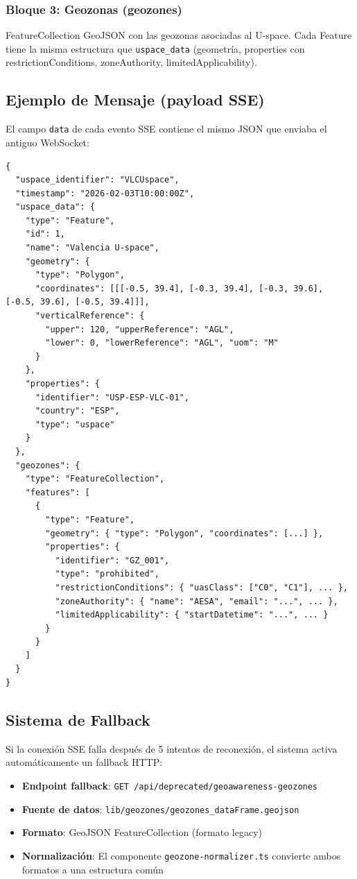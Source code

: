 \documentclass[12pt,a4paper]{article}
\begin{document}
\subsubsection{Bloque 3: Geozonas (geozones)}
FeatureCollection GeoJSON con las geozonas asociadas al U-space. Cada Feature tiene la misma estructura que \texttt{uspace\_data} (geometría, properties con restrictionConditions, zoneAuthority, limitedApplicability).

\subsection{Ejemplo de Mensaje (payload SSE)}
El campo \texttt{data} de cada evento SSE contiene el mismo JSON que enviaba el antiguo WebSocket:
\begin{lstlisting}[style=json]
{
  "uspace_identifier": "VLCUspace",
  "timestamp": "2026-02-03T10:00:00Z",
  "uspace_data": {
    "type": "Feature",
    "id": 1,
    "name": "Valencia U-space",
    "geometry": {
      "type": "Polygon",
      "coordinates": [[[-0.5, 39.4], [-0.3, 39.4], [-0.3, 39.6], [-0.5, 39.6], [-0.5, 39.4]]],
      "verticalReference": {
        "upper": 120, "upperReference": "AGL",
        "lower": 0, "lowerReference": "AGL", "uom": "M"
      }
    },
    "properties": {
      "identifier": "USP-ESP-VLC-01",
      "country": "ESP",
      "type": "uspace"
    }
  },
  "geozones": {
    "type": "FeatureCollection",
    "features": [
      {
        "type": "Feature",
        "geometry": { "type": "Polygon", "coordinates": [...] },
        "properties": {
          "identifier": "GZ_001",
          "type": "prohibited",
          "restrictionConditions": { "uasClass": ["C0", "C1"], ... },
          "zoneAuthority": { "name": "AESA", "email": "...", ... },
          "limitedApplicability": { "startDatetime": "...", ... }
        }
      }
    ]
  }
}
\end{lstlisting}

\subsection{Sistema de Fallback}
Si la conexión SSE falla después de 5 intentos de reconexión, el sistema activa automáticamente un fallback HTTP:

\begin{itemize}
    \item \textbf{Endpoint fallback}: \texttt{GET /api/deprecated/geoawareness-geozones}
    \item \textbf{Fuente de datos}: \texttt{lib/geozones/geozones\_dataFrame.geojson}
    \item \textbf{Formato}: GeoJSON FeatureCollection (formato legacy)
    \item \textbf{Normalización}: El componente \texttt{geozone-normalizer.ts} convierte ambos formatos a una estructura común
\end{itemize}
\end{document}
